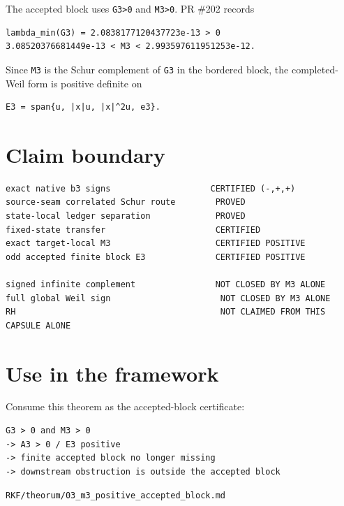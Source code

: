 The accepted block uses \texttt{G3\textgreater{}0} and \texttt{M3\textgreater{}0}. PR \#202 records

\begin{verbatim}
lambda_min(G3) = 2.0838177120437723e-13 > 0
3.08520376681449e-13 < M3 < 2.993597611951253e-12.
\end{verbatim}

Since \texttt{M3} is the Schur complement of \texttt{G3} in the bordered block, the completed-Weil form is positive definite on

\begin{verbatim}
E3 = span{u, |x|u, |x|^2u, e3}.
\end{verbatim}

\hypertarget{claim-boundary}{%
\section{Claim boundary}\label{claim-boundary}}

\begin{verbatim}
exact native b3 signs                    CERTIFIED (-,+,+)
source-seam correlated Schur route        PROVED
state-local ledger separation             PROVED
fixed-state transfer                      CERTIFIED
exact target-local M3                     CERTIFIED POSITIVE
odd accepted finite block E3              CERTIFIED POSITIVE

signed infinite complement                NOT CLOSED BY M3 ALONE
full global Weil sign                      NOT CLOSED BY M3 ALONE
RH                                         NOT CLAIMED FROM THIS CAPSULE ALONE
\end{verbatim}

\hypertarget{use-in-the-framework}{%
\section{Use in the framework}\label{use-in-the-framework}}

Consume this theorem as the accepted-block certificate:

\begin{verbatim}
G3 > 0 and M3 > 0
-> A3 > 0 / E3 positive
-> finite accepted block no longer missing
-> downstream obstruction is outside the accepted block
\end{verbatim}

\begin{flushright}\small\texttt{RKF/theorum/03\_m3\_positive\_accepted\_block.md}\end{flushright}
